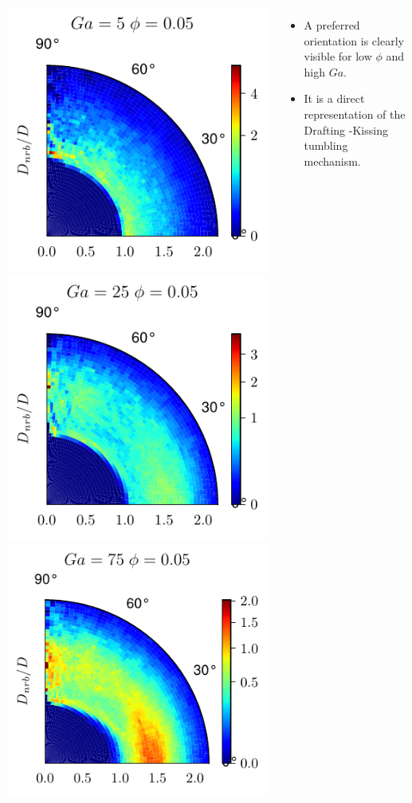 \documentclass{sintefbeamer}
\begin{document}
\begin{frame}
\begin{columns}
\begin{flushright}
        \includegraphics[height=0.3\textwidth]{image/HOMOGENEOUS/fDrop/Pnst_mu_r_0_1_Ga_5_PHI_0_05.pdf}
        \includegraphics[height=0.3\textwidth]{image/HOMOGENEOUS/fDrop/Pnst_mu_r_0_1_Ga_25_PHI_0_05.pdf}
        \includegraphics[height=0.3\textwidth]{image/HOMOGENEOUS/fDrop/Pnst_mu_r_0_1_Ga_75_PHI_0_05.pdf}
      \end{flushright}
        
    
    \begin{itemize}
      \item A preferred orientation is clearly visible for low $\phi$ and high $Ga$. 
      \item It is a direct representation of the Drafting -Kissing tumbling mechanism. 
    \end{itemize}
  \end{columns}
\end{frame}
\end{document}
